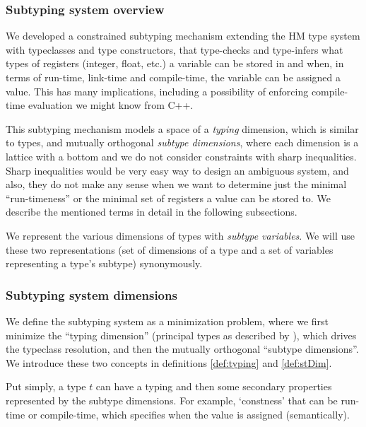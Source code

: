 \subsubsection{Subtyping system overview}

We developed a constrained subtyping mechanism extending the HM type system with typeclasses and type constructors, that type-checks and type-infers what types of registers (integer, float, etc.) a variable can be stored in and when, in terms of run-time, link-time and compile-time, the variable can be assigned a value. This has many implications, including a possibility of enforcing compile-time evaluation we might know from C++.

This subtyping mechanism models a space of a \emph{typing} dimension, which is similar to types, and mutually orthogonal \emph{subtype dimensions}, where each dimension is a lattice with a bottom and we do not consider constraints with sharp inequalities. Sharp inequalities would be very easy way to design an ambiguous system, and also, they do not make any sense when we want to determine just the minimal ``run-timeness'' or the minimal set of registers a value can be stored to. We describe the mentioned terms in detail in the following subsections.

We represent the various dimensions of types with \emph{subtype variables}. We will use these two representations (set of dimensions of a type and a set of variables representing a type's subtype) synonymously.

\subsubsection{Subtyping system dimensions}

We define the subtyping system as a minimization problem, where we first minimize the ``typing dimension'' (principal types as described by \citet{damas1982principal}), which drives the typeclass resolution, and then the mutually orthogonal ``subtype dimensions''. We introduce these two concepts in definitions \ref{def:typing} and \ref{def:stDim}.

Put simply, a type $t$ can have a typing  and then some secondary properties represented by the subtype dimensions. For example, `constness' that can be run-time or compile-time, which specifies when the value is assigned (semantically).

